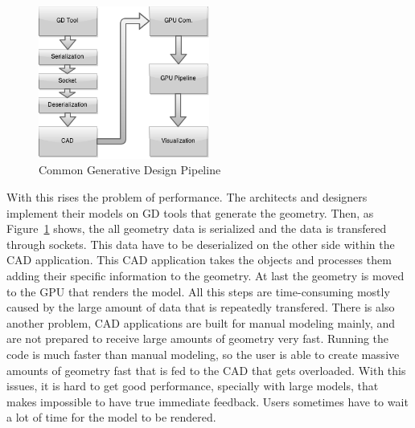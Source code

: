 \begin{figure}
	\vspace{-15pt}
    \centering
	\includegraphics[width=0.5\textwidth]{img/Architecture/GD-Common-Pipeline.png}
	\caption{Common Generative Design Pipeline}
	\label{fig:GD_Pipeline}
	\vspace{-15pt}
\end{figure}

With this rises the problem of performance. The architects and designers implement their models on GD tools that generate the geometry. Then, as Figure~\ref{fig:GD_Pipeline} shows, the all geometry data is serialized and the data is transfered through sockets. This data have to be deserialized on the other side within the CAD application. This CAD application takes the objects and processes them adding their specific information to the geometry. At last the geometry is moved to the GPU that renders the model. All this steps are time-consuming mostly caused by the large amount of data that is repeatedly transfered. There is also another problem, CAD applications are built for manual modeling mainly, and are not prepared to receive large amounts of geometry very fast. Running the code is much faster than manual modeling, so the user is able to create massive amounts of geometry fast that is fed to the CAD that gets overloaded. With this issues, it is hard to get good performance, specially with large models, that makes impossible to have true immediate feedback. Users sometimes have to wait a lot of time for the model to be rendered.


